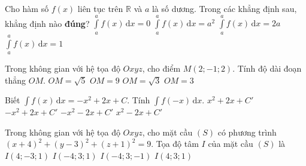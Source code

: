 \begin{ex}%
Cho hàm số $f(x)$ liên tục trên $\mathbb{R}$ và $a$ là số dương. Trong các khẳng định sau, khẳng định nào \textbf{đúng}?
\choice 
{\True $\displaystyle\int\limits_a^af(x) \mathrm{\,d}x=0$}
{$\displaystyle\int\limits_a^af(x) \mathrm{\,d}x=a^2$}
{$\displaystyle\int\limits_a^a f(x) \mathrm{\,d}x=2a$}
{$\displaystyle\int\limits_a^a f(x) \mathrm{\,d}x=1$}

\end{ex}
\begin{ex}%
Trong không gian với hệ tọa độ $Oxyz$, cho điểm $M(2;-1;2)$. Tính độ dài đoạn thẳng $OM$.
\choice 
{$OM=\sqrt{5}$}
{$OM=9$}
{$OM=\sqrt{3}$}
{\True $OM=3$}

\end{ex}
\begin{ex}%
Biết $\displaystyle\int\limits f(x) \mathrm{\,d}x=-x^2+2x+C$. Tính $\displaystyle\int\limits f(-x) \mathrm{\,d}x$.
\choice 
{\True $x^2+2x+C'$}
{$-x^2+2x+C'$}
{$-x^2-2x+C'$}
{$x^2-2x+C'$}

\end{ex}

\begin{ex}%
Trong không gian với hệ tọa độ $Oxyz$, cho mặt cầu $(S)$ có phương trình $(x+4)^2+(y-3)^2+(z+1)^2=9$. Tọa độ tâm $I$ của mặt cầu $(S)$ là
\choice 
{$I(4;-3;1)$}
{$I(-4;3;1)$}
{\True $I(-4;3;-1)$}
{$I(4;3;1)$}

\end{ex}

